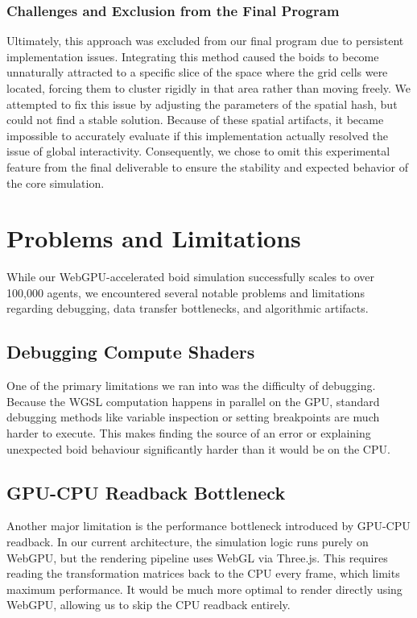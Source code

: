 \documentclass[a4paper, 12pt]{article}
\begin{document}
\subsubsection*{Challenges and Exclusion from the Final Program}
Ultimately, this approach was excluded from our final program due to persistent implementation issues. Integrating this method caused the boids to become unnaturally attracted to a specific slice of the space where the grid cells were located, forcing them to cluster rigidly in that area rather than moving freely.
\medbreak
We attempted to fix this issue by adjusting the parameters of the spatial hash, but could not find a stable solution. Because of these spatial artifacts, it became impossible to accurately evaluate if this implementation actually resolved the issue of global interactivity. Consequently, we chose to omit this experimental feature from the final deliverable to ensure the stability and expected behavior of the core simulation.

\section{Problems and Limitations}
\label{sec:problems_and_limitations}

While our WebGPU-accelerated boid simulation successfully scales to over
100,000 agents, we encountered several notable problems and limitations
regarding debugging, data transfer bottlenecks, and algorithmic artifacts.

\subsection{Debugging Compute Shaders}
One of the primary limitations we ran into was the difficulty of debugging.
Because the WGSL computation happens in parallel on the GPU, standard debugging
methods like variable inspection or setting breakpoints are much harder to
execute. This makes finding the source of an error or explaining unexpected
boid behaviour significantly harder than it would be on the CPU.

\subsection{GPU-CPU Readback Bottleneck}
Another major limitation is the performance bottleneck introduced by GPU-CPU
readback. In our current architecture, the simulation logic runs purely on
WebGPU, but the rendering pipeline uses WebGL via Three.js. This requires
reading the transformation matrices back to the CPU every frame, which limits
maximum performance. It would be much more optimal to render directly using
WebGPU, allowing us to skip the CPU readback entirely.
\end{document}
